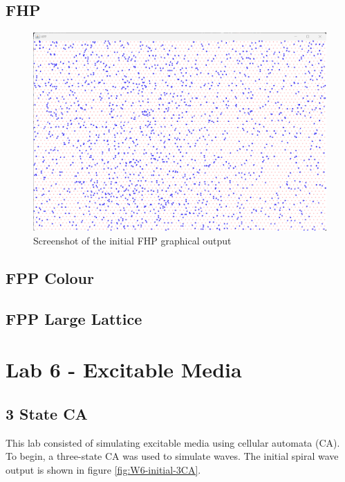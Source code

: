 \subsection{FHP}

\begin{figure}[H] 
    \centering
    \includegraphics[width=0.9\columnwidth]{Figures/Week 5/FHP Initial Run .png}
    \caption{Screenshot of the initial FHP graphical output}
    \label{fig:W5-fhp-initial}
\end{figure}
\subsection{FPP Colour}
\subsection{FPP Large Lattice}





\newpage
\section{Lab 6 - Excitable Media} 
\newpage
\subsection{3 State CA}
This lab consisted of simulating excitable media using cellular automata (CA). To begin, a three-state CA was used to simulate waves. The initial spiral wave output is shown in figure \autoref{fig:W6-initial-3CA}.

